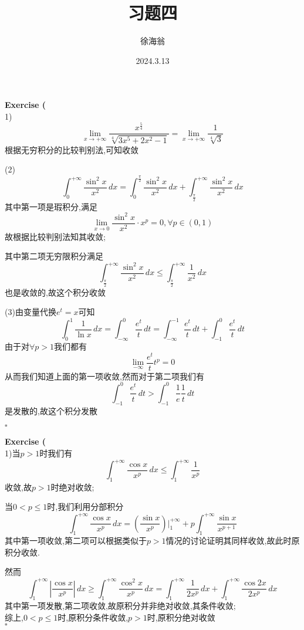 \documentclass{article}
\title{习题四}
\author{徐海翁}
\date{2024.3.13}
\newenvironment{exercise}[1]{%
{\textbf{Exercise #1} \\ 
    }
}{
  \hfill $\square$ 
  \par\bigskip 
}
\newcommand{\abs}[1]{\left|#1\right|}
\begin{document}
\begin{CJK}{UTF8}{gkai}

\maketitle
\tableofcontents

\begin{exercise}{8.5}
    (1)
    \[\lim_{x\to +\infty}\dfrac{x^{\frac{5}{4}}}{\sqrt[4]{3x^5 + 2x^2 - 1}} = \lim_{x\to +\infty}\dfrac{1}{\sqrt[4]{3}}\]
    根据无穷积分的比较判别法,可知收敛

    (2)
    \[\int_{0}^{+\infty}\dfrac{\sin^2 x}{x^2}\, dx  = \int_{0}^{\frac{\pi}{2}}\dfrac{\sin^2 x}{x^2} \, dx + \int_{\frac{\pi}{2}}^{+\infty}\dfrac{\sin^2 x}{x^2}\, dx \]
    其中第一项是瑕积分,满足
    \[\lim_{x \to 0}\dfrac{\sin^2 x}{x^2} \cdot x^p = 0,\forall p \in (0,1)\]
    故根据比较判别法知其收敛;

    其中第二项无穷限积分满足
    \[\int_{\frac{\pi}{2}}^{+\infty}\dfrac{\sin^2 x}{x^2}\, dx \leq \int_{\frac{\pi}{2}}^{+\infty}\dfrac{1}{x^2}\, dx \]
    也是收敛的,故这个积分收敛

    (3)由变量代换$e^t = x$可知
    \[\int_{0}^{1}\frac{1}{\ln x}\, dx =\int_{-\infty}^{0}\frac{e^t}{t}\, dt = \int_{-\infty}^{-1}\frac{e^t}{t}\, dt + \int_{-1}^{0}\frac{e^t}{t}\, dt\]
    由于对$\forall p > 1$我们都有
    \[\lim_{-\infty}\frac{e^t}{t} t^p = 0\]
    从而我们知道上面的第一项收敛,然而对于第二项我们有
    \[\int_{-1}^{0}\frac{e^t}{t}\, dt > \int_{-1}^{0}\frac{1}{e} \frac{1}{t}\, dt\]
    是发散的,故这个积分发散
\end{exercise}

\begin{exercise}{8.6}
    (1)当$p > 1$时我们有
    \[\int_{1}^{+\infty}\frac{\cos x}{x^p}\, dx \leq \int_{1}^{+\infty}\frac{1}{x^p}\]
    收敛,故$p > 1$时绝对收敛;

    当$0 < p \leq 1$时,我们利用分部积分
    \[\int_{1}^{+\infty}\frac{\cos x}{x^p}\, dx  = (\frac{\sin x}{x^p})|_1^{+\infty} + p\int_{1}^{+\infty}\frac{\sin x}{x^{p + 1}}\]
    其中第一项收敛,第二项可以根据类似于$p > 1$情况的讨论证明其同样收敛,故此时原积分收敛.

    然而
    \[\int_{1}^{+\infty}\abs{\frac{\cos x}{x^p}}\, dx \geq \int_{1}^{+\infty}\frac{\cos^2 x}{x^p}\, dx = \int_{1}^{+\infty}\frac{1}{2x^p}\, dx + \int_{1}^{+\infty}\frac{\cos 2x}{2x^p}\, dx\]
    其中第一项发散,第二项收敛,故原积分并非绝对收敛,其条件收敛;\\

    综上,$0< p \leq 1$时,原积分条件收敛,$p > 1$时,原积分绝对收敛\\


\end{exercise}
\end{CJK}
\end{document}

